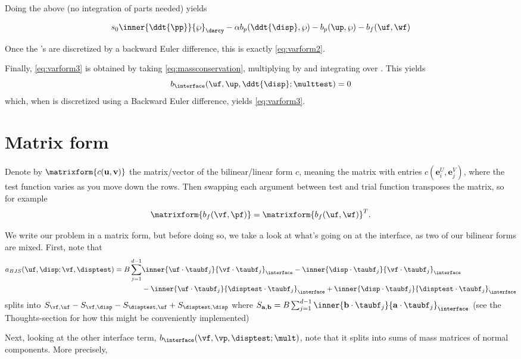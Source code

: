 \documentclass{article}
\begin{document}
Doing the above (no integration of parts needed) yields

$$s_0\inner{\ddt{\pp}}{\wp}_{\darcy} - \alpha b_p(\ddt{\disp}, \wp)
- b_p(\up, \wp) - b_f(\uf, \wf)$$ 

Once the \ddt{}'s are discretized by a backward Euler difference, this is exactly \eqref{eq:varform2}.

Finally, \eqref{eq:varform3} is obtained by taking \eqref{eq:massconservation}, multiplying by \multtest and integrating over \interface. This yields $$b_{\interface} (\uf, \up, \ddt{\disp} ;\multtest) = 0$$
which, when \ddt{\disp} is discretized using a Backward Euler difference, yields \eqref{eq:varform3}.



\section{Matrix form}
Denote by $\matrixform{c(\mathbf{u}, \mathbf{v})}$ the matrix/vector of the bilinear/linear form $c$, meaning the matrix with entries $c(\mathbf{e}^U_i, \mathbf{e}^V_j)$, where the test function varies as you move down the rows. Then swapping each argument between test and trial function transposes the matrix, so for example $$\matrixform{b_f(\vf, \pf)} = \matrixform{b_f(\uf, \wf)}^T. $$
 
We write our problem in a matrix form, but before doing so, we take a look at what's going on at the interface, as two of our bilinear forms are mixed. First, note that
\begin{align*}
a_{BJS}(\uf, \disp; \vf, \disptest) = B \sum_{j=1}^{d-1} & \inner{\uf \cdot \taubf_j}{\vf \cdot \taubf_j}_{\interface} - \inner{\disp \cdot \taubf_j}{\vf \cdot \taubf_j}_{\interface} \\
                                                         & - \inner{\uf \cdot \taubf_j}{\disptest \cdot \taubf_j}_{\interface}+ \inner{\disp \cdot \taubf_j}{\disptest \cdot \taubf_j}_{\interface}
\end{align*}
splits into $S_{\vf, \uf} - S_{\vf, \disp} - S_{\disptest, \uf} + S_{\disptest, \disp}$
where $S_{\mathbf{a}, \mathbf{b}} = B \sum_{j=1}^{d-1} \inner{\mathbf{b} \cdot \taubf_j}{\mathbf{a} \cdot \taubf_j}_{\interface}$ (see the Thoughts-section for how this might be conveniently implemented)

Next, looking at the other interface term, $b_{\interface}(\vf, \vp, \disptest; \mult)$, note that it splits into sums of mass matrices of normal components. More precisely,
\end{document}
